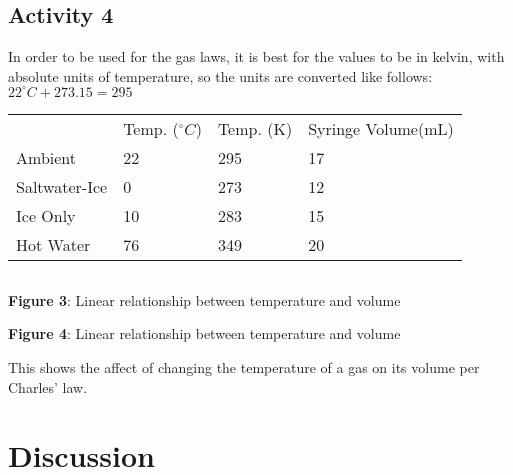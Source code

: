 \documentclass{article}
\begin{document}
\subsection{Activity 4}
In order to be used for the gas laws, it is best for the values to be in kelvin, with absolute units of temperature, so the units are converted like follows: $22^\circ C+273.15 = 295$


\centering
\begin{minipage}{0.4\textwidth}
\begin{table}[H]
    \begin{tabularx}{400pt}{p{1.7cm}|p{1cm}|p{1cm}|p{1cm}|} &Temp. ($^\circ C$) &Temp. (K)& Syringe Volume(mL) \\ \cline{1-4}
    Ambient&22&295&17\\
    Saltwater-Ice&0&273&12\\
    Ice Only&10&283&15\\
    Hot Water&76&349&20\\
    
    \end{tabularx}
\end{table}
\end{minipage}
\hfill
\begin{minipage}{0.5\textwidth}

\end{minipage}


$\ $

\textbf{Figure 3}: Linear relationship between temperature and volume

\textbf{Figure 4}: Linear relationship between temperature and volume

This shows the affect of changing the temperature of a gas on its volume per Charles' law.
\section{Discussion}
\end{document}
